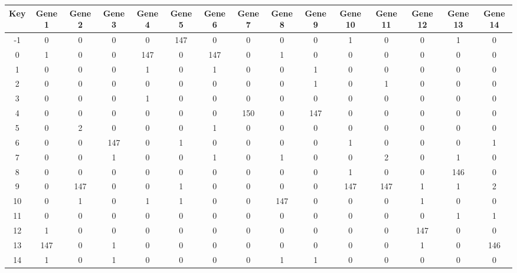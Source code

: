 \begin{tabular}{|c|c|c|c|c|c|c|c|c|c|c|c|c|c|c|}
\hline
Key & Gene 1 & Gene 2 & Gene 3 & Gene 4 & Gene 5 & Gene 6 & Gene 7 & Gene 8 & Gene 9 & Gene 10 & Gene 11 & Gene 12 & Gene 13 & Gene 14 \\
\hline
-1 & 0 & 0 & 0 & 0 & 147 & 0 & 0 & 0 & 0 & 1 & 0 & 0 & 1 & 0 \\
0 & 1 & 0 & 0 & 147 & 0 & 147 & 0 & 1 & 0 & 0 & 0 & 0 & 0 & 0 \\
1 & 0 & 0 & 0 & 1 & 0 & 1 & 0 & 0 & 1 & 0 & 0 & 0 & 0 & 0 \\
2 & 0 & 0 & 0 & 0 & 0 & 0 & 0 & 0 & 1 & 0 & 1 & 0 & 0 & 0 \\
3 & 0 & 0 & 0 & 1 & 0 & 0 & 0 & 0 & 0 & 0 & 0 & 0 & 0 & 0 \\
4 & 0 & 0 & 0 & 0 & 0 & 0 & 150 & 0 & 147 & 0 & 0 & 0 & 0 & 0 \\
5 & 0 & 2 & 0 & 0 & 0 & 1 & 0 & 0 & 0 & 0 & 0 & 0 & 0 & 0 \\
6 & 0 & 0 & 147 & 0 & 1 & 0 & 0 & 0 & 0 & 1 & 0 & 0 & 0 & 1 \\
7 & 0 & 0 & 1 & 0 & 0 & 1 & 0 & 1 & 0 & 0 & 2 & 0 & 1 & 0 \\
8 & 0 & 0 & 0 & 0 & 0 & 0 & 0 & 0 & 0 & 1 & 0 & 0 & 146 & 0 \\
9 & 0 & 147 & 0 & 0 & 1 & 0 & 0 & 0 & 0 & 147 & 147 & 1 & 1 & 2 \\
10 & 0 & 1 & 0 & 1 & 1 & 0 & 0 & 147 & 0 & 0 & 0 & 1 & 0 & 0 \\
11 & 0 & 0 & 0 & 0 & 0 & 0 & 0 & 0 & 0 & 0 & 0 & 0 & 1 & 1 \\
12 & 1 & 0 & 0 & 0 & 0 & 0 & 0 & 0 & 0 & 0 & 0 & 147 & 0 & 0 \\
13 & 147 & 0 & 1 & 0 & 0 & 0 & 0 & 0 & 0 & 0 & 0 & 1 & 0 & 146 \\
14 & 1 & 0 & 1 & 0 & 0 & 0 & 0 & 1 & 1 & 0 & 0 & 0 & 0 & 0 \\
\hline
\end{tabular}